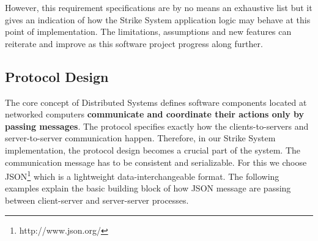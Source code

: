 \documentclass[dareport.tex]{subfiles}
\begin{document}
However, this requirement specifications are by no means an exhaustive list but it gives an indication of how the Strike System application logic may behave at this point of implementation. The limitations, assumptions and new features can reiterate and improve as this software project progress along further.

\subsection{Protocol Design}
The core concept of Distributed Systems defines software components 
located at networked computers \textbf{communicate and coordinate their actions only by passing messages}\cite{coulouris}. The protocol specifies exactly how the clients-to-servers and server-to-server communication happen. Therefore, in our Strike System implementation, the protocol design becomes a crucial part of the system. The communication message has to be consistent and serializable. For this we choose JSON\footnote{http://www.json.org/} which is a lightweight data-interchangeable format. The following examples explain the basic building block of how JSON message are passing between client-server and server-server processes.
\end{document}
